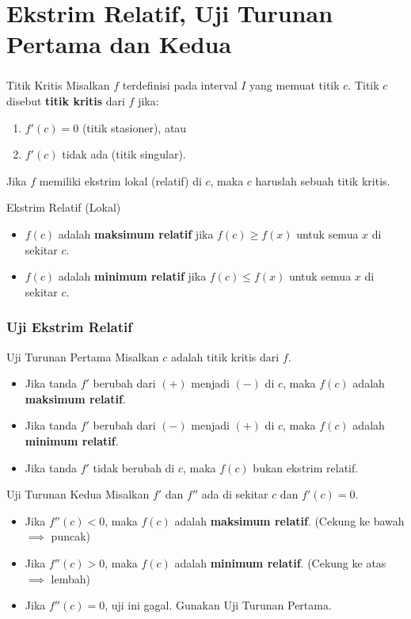 \documentclass{../../kalkulus-ppt}
\begin{document}
\section{Ekstrim Relatif, Uji Turunan Pertama dan Kedua}
\begin{frame}
  \frametitle{\insertsection}
  \begin{definisi}{Titik Kritis}
    Misalkan $f$ terdefinisi pada interval $I$ yang memuat titik $c$. Titik $c$ disebut \textbf{titik kritis} dari $f$ jika:
    \begin{enumerate}
      \item $f'(c) = 0$ (titik stasioner), atau
      \item $f'(c)$ tidak ada (titik singular).
    \end{enumerate}
    Jika $f$ memiliki ekstrim lokal (relatif) di $c$, maka $c$ haruslah sebuah titik kritis.
  \end{definisi}
  \pause
  \begin{block}{Ekstrim Relatif (Lokal)}
    \begin{itemize}
      \item $f(c)$ adalah \textbf{maksimum relatif} jika $f(c) \ge f(x)$ untuk semua $x$ di sekitar $c$.
      \item $f(c)$ adalah \textbf{minimum relatif} jika $f(c) \le f(x)$ untuk semua $x$ di sekitar $c$.
    \end{itemize}
  \end{block}
\end{frame}

\begin{frame}
  \frametitle{Uji Ekstrim Relatif}
  \begin{alertblock}{Uji Turunan Pertama}
    Misalkan $c$ adalah titik kritis dari $f$.
    \begin{itemize}
      \item Jika tanda $f'$ berubah dari $(+)$ menjadi $(-)$ di $c$, maka $f(c)$ adalah \textbf{maksimum relatif}.
      \item Jika tanda $f'$ berubah dari $(-)$ menjadi $(+)$ di $c$, maka $f(c)$ adalah \textbf{minimum relatif}.
      \item Jika tanda $f'$ tidak berubah di $c$, maka $f(c)$ bukan ekstrim relatif.
    \end{itemize}
  \end{alertblock}
  \pause
  \begin{funfact}{Uji Turunan Kedua}
    Misalkan $f'$ dan $f''$ ada di sekitar $c$ dan $f'(c)=0$.
    \begin{itemize}
      \item Jika $f''(c) < 0$, maka $f(c)$ adalah \textbf{maksimum relatif}. (Cekung ke bawah $\implies$ puncak)
      \item Jika $f''(c) > 0$, maka $f(c)$ adalah \textbf{minimum relatif}. (Cekung ke atas $\implies$ lembah)
      \item Jika $f''(c) = 0$, uji ini gagal. Gunakan Uji Turunan Pertama.
    \end{itemize}
  \end{funfact}
\end{frame}
\end{document}
